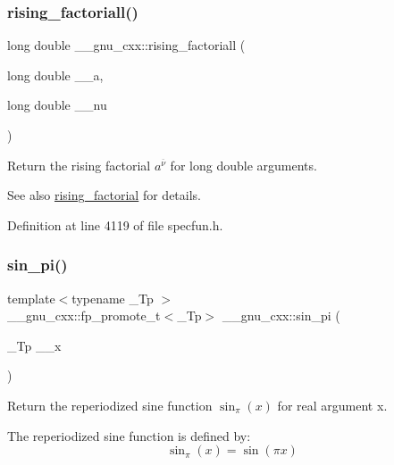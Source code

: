 \subsubsection{\texorpdfstring{rising\+\_\+factoriall()}{rising\_factoriall()}}
{\footnotesize\ttfamily long double \+\_\+\+\_\+gnu\+\_\+cxx\+::rising\+\_\+factoriall (\begin{DoxyParamCaption}\item[{long double}]{\+\_\+\+\_\+a,  }\item[{long double}]{\+\_\+\+\_\+nu }\end{DoxyParamCaption})\hspace{0.3cm}{\ttfamily [inline]}}

Return the rising factorial $ a^{\overline{\nu}} $ for {\ttfamily  long double } arguments.

\begin{DoxySeeAlso}{See also}
\hyperlink{group__mathsf__gnu_gae8c36a0e1f60254cf212a3806f7c675c}{rising\+\_\+factorial} for details. 
\end{DoxySeeAlso}


Definition at line 4119 of file specfun.\+h.

\mbox{\label{group__mathsf__gnu_ga220f8a9a0477697cff96e84dc911d5f0}} 
\subsubsection{\texorpdfstring{sin\+\_\+pi()}{sin\_pi()}}
{\footnotesize\ttfamily template$<$typename \+\_\+\+Tp $>$ \\
\+\_\+\+\_\+gnu\+\_\+cxx\+::fp\+\_\+promote\+\_\+t$<$\+\_\+\+Tp$>$ \+\_\+\+\_\+gnu\+\_\+cxx\+::sin\+\_\+pi (\begin{DoxyParamCaption}\item[{\+\_\+\+Tp}]{\+\_\+\+\_\+x }\end{DoxyParamCaption})\hspace{0.3cm}{\ttfamily [inline]}}

Return the reperiodized sine function $ \sin_\pi(x) $ for real argument {\ttfamily x}.

The reperiodized sine function is defined by\+: \[ \sin_\pi(x) = \sin(\pi x) \]


